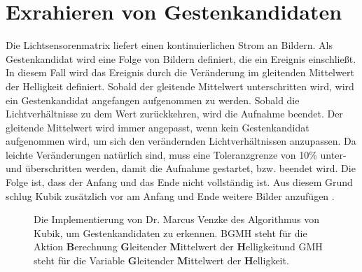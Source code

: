 \section{Exrahieren von Gestenkandidaten}
\label{sec:gesture_extraction}
Die Lichtsensorenmatrix liefert einen kontinuierlichen Strom an Bildern. Als Gestenkandidat wird eine Folge von Bildern definiert, die
ein Ereignis einschließt. In diesem Fall wird das Ereignis durch die Veränderung im gleitenden Mittelwert der Helligkeit definiert. Sobald der gleitende Mittelwert unterschritten wird, wird ein Gestenkandidat
angefangen aufgenommen zu werden. Sobald die Lichtverhältnisse zu dem Wert zurückkehren, wird die Aufnahme beendet. Der gleitende Mittelwert wird immer angepasst, wenn kein Gestenkandidat aufgenommen wird, um
sich den verändernden Lichtverhältnissen anzupassen. Da leichte Veränderungen natürlich sind, muss eine Toleranzgrenze von 10\% unter- und überschritten werden, damit die Aufnahme gestartet, bzw. beendet wird.
Die Folge ist, dass der Anfang und das Ende nicht vollständig ist. Aus diesem Grund schlug Kubik zusätzlich vor am Anfang und Ende weitere Bilder anzufügen \cite{kubikThesis}.
\begin{figure}
    \usetikzlibrary{arrows,automata,positioning}
    \centering
    \caption{Die Implementierung von Dr. Marcus Venzke des Algorithmus von Kubik, um Gestenkandidaten zu erkennen. BGMH steht für die Aktion \glqq \textbf{B}erechnung \textbf{G}leitender \textbf{M}ittelwert der \textbf{H}elligkeit\grqq und GMH steht für die Variable \glqq \textbf{G}leitender \textbf{M}ittelwert der \textbf{H}elligkeit\grqq.}
    \label{fig:venzkeAlgoImpl}
\end{figure}
